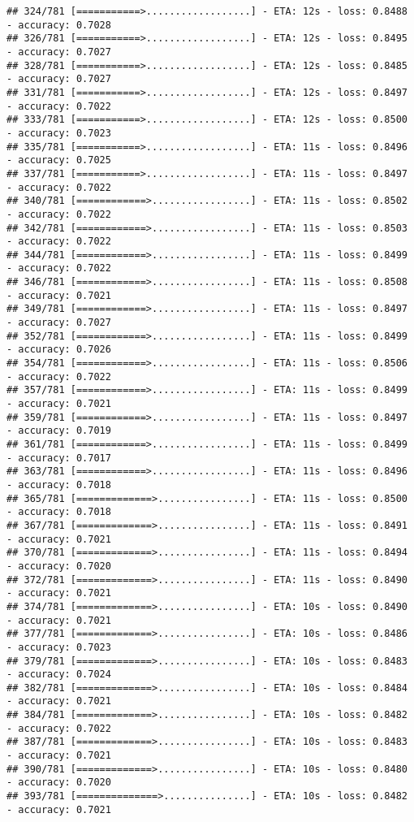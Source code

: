 \documentclass[
]{article}
\begin{document}
\begin{verbatim}
## 324/781 [===========>..................] - ETA: 12s - loss: 0.8488 - accuracy: 0.7028
## 326/781 [===========>..................] - ETA: 12s - loss: 0.8495 - accuracy: 0.7027
## 328/781 [===========>..................] - ETA: 12s - loss: 0.8485 - accuracy: 0.7027
## 331/781 [===========>..................] - ETA: 12s - loss: 0.8497 - accuracy: 0.7022
## 333/781 [===========>..................] - ETA: 12s - loss: 0.8500 - accuracy: 0.7023
## 335/781 [===========>..................] - ETA: 11s - loss: 0.8496 - accuracy: 0.7025
## 337/781 [===========>..................] - ETA: 11s - loss: 0.8497 - accuracy: 0.7022
## 340/781 [============>.................] - ETA: 11s - loss: 0.8502 - accuracy: 0.7022
## 342/781 [============>.................] - ETA: 11s - loss: 0.8503 - accuracy: 0.7022
## 344/781 [============>.................] - ETA: 11s - loss: 0.8499 - accuracy: 0.7022
## 346/781 [============>.................] - ETA: 11s - loss: 0.8508 - accuracy: 0.7021
## 349/781 [============>.................] - ETA: 11s - loss: 0.8497 - accuracy: 0.7027
## 352/781 [============>.................] - ETA: 11s - loss: 0.8499 - accuracy: 0.7026
## 354/781 [============>.................] - ETA: 11s - loss: 0.8506 - accuracy: 0.7022
## 357/781 [============>.................] - ETA: 11s - loss: 0.8499 - accuracy: 0.7021
## 359/781 [============>.................] - ETA: 11s - loss: 0.8497 - accuracy: 0.7019
## 361/781 [============>.................] - ETA: 11s - loss: 0.8499 - accuracy: 0.7017
## 363/781 [============>.................] - ETA: 11s - loss: 0.8496 - accuracy: 0.7018
## 365/781 [=============>................] - ETA: 11s - loss: 0.8500 - accuracy: 0.7018
## 367/781 [=============>................] - ETA: 11s - loss: 0.8491 - accuracy: 0.7021
## 370/781 [=============>................] - ETA: 11s - loss: 0.8494 - accuracy: 0.7020
## 372/781 [=============>................] - ETA: 11s - loss: 0.8490 - accuracy: 0.7021
## 374/781 [=============>................] - ETA: 10s - loss: 0.8490 - accuracy: 0.7021
## 377/781 [=============>................] - ETA: 10s - loss: 0.8486 - accuracy: 0.7023
## 379/781 [=============>................] - ETA: 10s - loss: 0.8483 - accuracy: 0.7024
## 382/781 [=============>................] - ETA: 10s - loss: 0.8484 - accuracy: 0.7021
## 384/781 [=============>................] - ETA: 10s - loss: 0.8482 - accuracy: 0.7022
## 387/781 [=============>................] - ETA: 10s - loss: 0.8483 - accuracy: 0.7021
## 390/781 [=============>................] - ETA: 10s - loss: 0.8480 - accuracy: 0.7020
## 393/781 [==============>...............] - ETA: 10s - loss: 0.8482 - accuracy: 0.7021

\end{verbatim}
\end{document}
